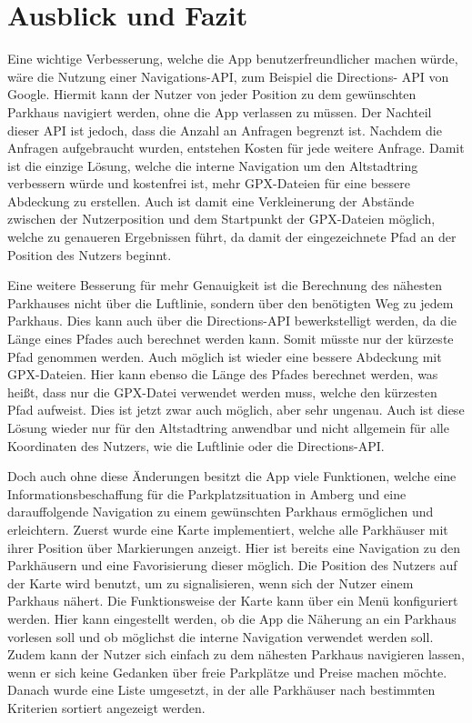 \chapter{Ausblick und Fazit}
\label{chap:7}

Eine wichtige Verbesserung, welche die App benutzerfreundlicher machen würde, wäre die Nutzung einer Navigations-API, zum Beispiel die Directions- API von Google. Hiermit kann der Nutzer von jeder Position zu dem gewünschten Parkhaus navigiert werden, ohne die App verlassen zu müssen. Der Nachteil dieser API ist jedoch, dass die Anzahl an Anfragen begrenzt ist. Nachdem die Anfragen aufgebraucht wurden, entstehen Kosten für jede weitere Anfrage. Damit ist die einzige Lösung, welche die interne Navigation um den Altstadtring verbessern würde und kostenfrei ist, mehr GPX-Dateien für eine bessere Abdeckung zu erstellen. Auch ist damit eine Verkleinerung der Abstände zwischen der Nutzerposition und dem Startpunkt der GPX-Dateien möglich, welche zu genaueren Ergebnissen führt, da damit der eingezeichnete Pfad an der Position des Nutzers beginnt.

Eine weitere Besserung für mehr Genauigkeit ist die Berechnung des nähesten Parkhauses nicht über die Luftlinie, sondern über den benötigten Weg zu jedem Parkhaus. Dies kann auch über die Directions-API bewerkstelligt werden, da die Länge eines Pfades auch berechnet werden kann. Somit müsste nur der kürzeste Pfad genommen werden. Auch möglich ist wieder eine bessere Abdeckung mit GPX-Dateien. Hier kann ebenso die Länge des Pfades berechnet werden, was heißt, dass nur die GPX-Datei verwendet werden muss, welche den kürzesten Pfad aufweist. Dies ist jetzt zwar auch möglich, aber sehr ungenau. Auch ist diese Lösung wieder nur für den Altstadtring anwendbar und nicht allgemein für alle Koordinaten des Nutzers, wie die Luftlinie oder die Directions-API.

Doch auch ohne diese Änderungen besitzt die App viele Funktionen, welche eine Informationsbeschaffung für die Parkplatzsituation in Amberg und eine darauffolgende Navigation zu einem gewünschten Parkhaus ermöglichen und erleichtern. Zuerst wurde eine Karte implementiert, welche alle Parkhäuser mit ihrer Position über Markierungen anzeigt. Hier ist bereits eine Navigation zu den Parkhäusern und eine Favorisierung dieser möglich. Die Position des Nutzers auf der Karte wird benutzt, um zu signalisieren, wenn sich der Nutzer einem Parkhaus nähert. Die Funktionsweise der Karte kann über ein Menü konfiguriert werden. Hier kann eingestellt werden, ob die App die Näherung an ein Parkhaus vorlesen soll und ob möglichst die interne Navigation verwendet werden soll. Zudem kann der Nutzer sich einfach zu dem nähesten Parkhaus navigieren lassen, wenn er sich keine Gedanken über freie Parkplätze und Preise machen möchte. Danach wurde eine Liste umgesetzt, in der alle Parkhäuser nach bestimmten Kriterien sortiert angezeigt werden. 

